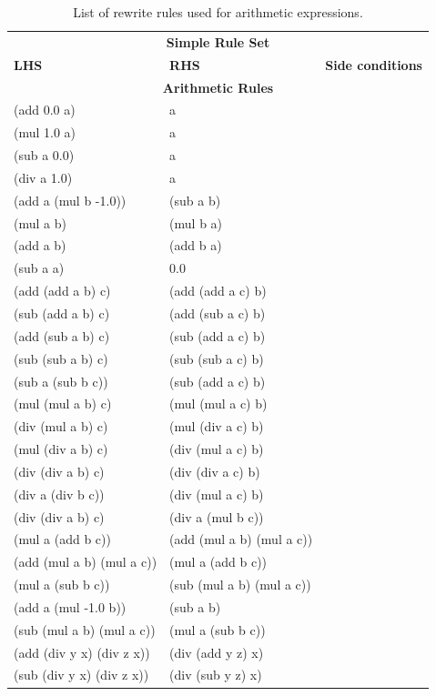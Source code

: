 \documentclass[fullpage,twocolumn]{article} %
\begin{document}
\begin{table}
  \centering
  \caption{List of rewrite rules used for arithmetic expressions.}
  \begin{tabular}{lll}
    \toprule
        \multicolumn{3}{c}{{\bf Simple Rule Set}} \\
        {\bf LHS}                        &  {\bf RHS}                  & {\bf Side conditions} \\ \midrule
       \multicolumn{3}{c}{{\bf Arithmetic Rules}} \\
       
 (add 0.0 a) & a \\
 (mul 1.0 a) & a \\
 (sub a 0.0) & a \\
 (div a 1.0) & a \\
 (add a (mul b -1.0)) & (sub a b) \\
 (mul a b) & (mul b a) \\
 (add a b) & (add b a) \\
 (sub a a) & 0.0 \\
 (add (add a b) c) & (add (add a c) b) \\
 (sub (add a b) c) & (add (sub a c) b) \\
 (add (sub a b) c) & (sub (add a c) b) \\
 (sub (sub a b) c) & (sub (sub a c) b) \\
 (sub a (sub b c)) & (sub (add a c) b) \\
 (mul (mul a b) c) & (mul (mul a c) b) \\
 (div (mul a b) c) & (mul (div a c) b) \\
 (mul (div a b) c) & (div (mul a c) b) \\
 (div (div a b) c) & (div (div a c) b) \\
 (div a (div b c)) & (div (mul a c) b) \\
 (div (div a b) c) & (div a (mul b c)) \\
 (mul a (add b c)) & (add (mul a b) (mul a c)) \\
 (add (mul a b) (mul a c)) & (mul a (add b c)) \\
 (mul a (sub b c)) & (sub (mul a b) (mul a c)) \\
 (add a (mul -1.0 b)) & (sub a b) \\
 (sub (mul a b) (mul a c)) & (mul a (sub b c)) \\
 (add (div y x) (div z x)) & (div (add y z) x) \\
 (sub (div y x) (div z x)) & (div (sub y z) x) \\

\end{tabular}
\end{table}
\end{document}
